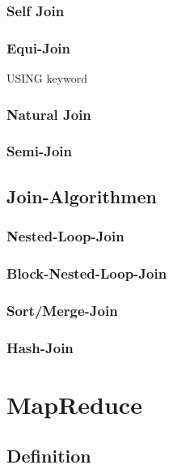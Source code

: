 \documentclass[a4paper]{article}
\begin{document}
\subsubsection{Self Join}

\subsubsection{Equi-Join}
USING keyword

\subsubsection{Natural Join}

\subsubsection{Semi-Join}

\newpage

\subsection{Join-Algorithmen}

\subsubsection{Nested-Loop-Join}

\subsubsection{Block-Nested-Loop-Join}

\subsubsection{Sort/Merge-Join}

\subsubsection{Hash-Join}

\newpage

\section{MapReduce}
\label{mapreduce}

\subsection{Definition}
\end{document}
